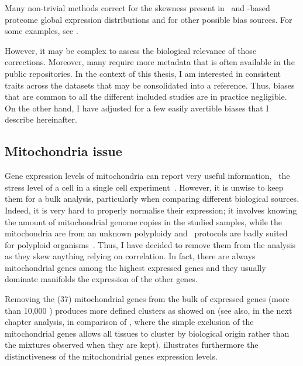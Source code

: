 Many non-trivial methods correct for the skewness present in
\Rnaseq\ and \ms-based proteome global expression distributions
and for other possible bias sources.
For some examples, see \citet{batchEffect,Leek2014-bl,Yi2018-rv,Li2014-cv,Stegle2012-td}.

However, it may be complex to assess the biological relevance of those corrections.
Moreover, many require more metadata that is often available in the public
repositories.
In the context of this thesis, I am interested in
consistent traits across the datasets that may be consolidated into a reference.
Thus, biases that are common to all the different included studies are in practice
negligible.
On the other hand, I have adjusted for a few easily avertible biases
that I describe hereinafter.

\subsection{Mitochondria issue}\label{subsec:mito}

Gene expression levels of mitochondria can report very useful information,
\eg\ the stress level of a cell in a single cell experiment~.
However, it is unwise to keep them for a bulk analysis, particularly when
comparing different biological sources.
Indeed, it is very hard to properly normalise their expression;
it involves knowing the amount of mitochondrial genome copies
in the studied samples, while the mitochondria are from an unknown polyploidy
and \Rnaseq\ protocols are badly suited for polyploid organisms~.
Thus, I have decided to remove them from the analysis as they skew anything relying
on correlation.
In fact, there are always mitochondrial genes among the highest expressed genes
and they usually dominate manifolds the expression of the other genes.

Removing the (37) mitochondrial genes from the bulk of expressed genes
(more than 10,000 \pcgs) produces more defined clusters as showed on
(see also, in the next chapter analysis,
 in comparison of ,
where the simple exclusion of the mitochondrial genes allows all tissues
to cluster by biological origin rather than the mixtures observed
when they are kept).
 illustrates furthermore the distinctiveness
of the mitochondrial genes expression levels.

